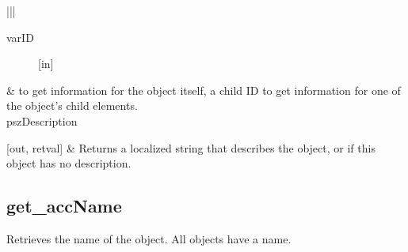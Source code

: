 \documentclass[letterpaper,12pt,english,openany,oneside]{sphinxmanual}
\begin{document}
\begin{sphinxVerbatim}[commandchars=\\\{\}]
    
\end{sphinxVerbatim}



\begin{savenotes}\sphinxattablestart
\centering
{}\label{\detokenize{MSAA_PDF:section-7}}\nobreak
\begin{tabular}[t]{|*{2}{|}}
\hline
\begin{description}
\item[{varID}] \leavevmode
{[}in{]}

\end{description}
&
 to get information for the object itself, a child ID to get information for one of the object’s child elements.
\\
\hline
pszDescription

{[}out, retval{]}
&
Returns a localized string that describes the object, or  if this object has no description.
\\
\hline
\end{tabular}
\par
\sphinxattableend\end{savenotes}


\begin{sphinxVerbatim}[commandchars=\\\{\}]
\end{sphinxVerbatim}


\subsection{get\_accName}
\label{\detokenize{MSAA_PDF:get-accname}}
Retrieves the name of the object. All objects have a name.

\begin{sphinxVerbatim}[commandchars=\\\{\}]
     
\end{sphinxVerbatim}
\end{document}
